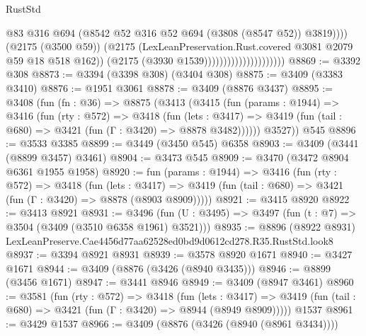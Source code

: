 \begin{lexlean}{RustStd}
\begin{coremodule}
                                                @83
                                                @316
                                                @694
                                                (@8542
                                                  @52
                                                  @316
                                                  @52
                                                  @694
                                                  (@3808 (@8547 @52))
                                                  @3819))))
                                          (@2175 (@3500 @59))
                                          (@2175
                                            (LexLeanPreservation.Rust.covered
                                              @3081
                                              @2079
                                              @59
                                              @18
                                              @518
                                              @162))
                                          (@2175 (@3930 @1539)))))))))))))))))))))
@8869 := @3392 @308
@8873 := @3394 (@3398 @308) (@3404 @308)
@8875 := @3409 (@3383 @3410)
@8876 := @1951 @3061
@8878 := @3409 (@8876 @3437)
@8895 := @3408
    (fun (fn : @36) =>
    @8875
      (@3413
        (@3415
          (fun (params : @1944) =>
          @3416
            (fun (rty : @572) =>
            @3418
              (fun (lets : @3417) =>
              @3419 (fun (tail : @680) => @3421 (fun (Γ : @3420) => @8878 @3482))))))
        @3527))
    @545
@8896 := @3533 @3385
@8899 := @3449 (@3450 @545) @6358
@8903 := @3409 (@3441 (@8899 @3457) @3461)
@8904 := @3473 @545
@8909 := @3470 (@3472 @8904 @6361 @1955 @1958)
@8920 := fun (params : @1944) =>
  @3416
    (fun (rty : @572) =>
    @3418
      (fun (lets : @3417) =>
      @3419 (fun (tail : @680) => @3421 (fun (Γ : @3420) => @8878 (@8903 @8909)))))
@8921 := @3415 @8920
@8922 := @3413 @8921
@8931 := @3496 (fun (U : @3495) => @3497 (fun (t : @7) => @3504 (@3409 (@3510 @6358 @1961) @3521)))
@8935 := @8896 (@8922 @8931) LexLeanPreserve.Cae4456d77aa62528ed0bd9d0612cd278.R35.RustStd.look8
@8937 := @3394 @8921 @8931
@8939 := @3578 @8920 @1671
@8940 := @3427 @1671
@8944 := @3409 (@8876 (@3426 (@8940 @3435)))
@8946 := @8899 (@3456 @1671)
@8947 := @3441 @8946
@8949 := @3409 (@8947 @3461)
@8960 := @3581
    (fun (rty : @572) =>
    @3418
      (fun (lets : @3417) =>
      @3419 (fun (tail : @680) => @3421 (fun (Γ : @3420) => @8944 (@8949 @8909)))))
    @1537
@8961 := @3429 @1537
@8966 := @3409 (@8876 (@3426 (@8940 (@8961 @3434))))

\end{coremodule}
\end{lexlean}
